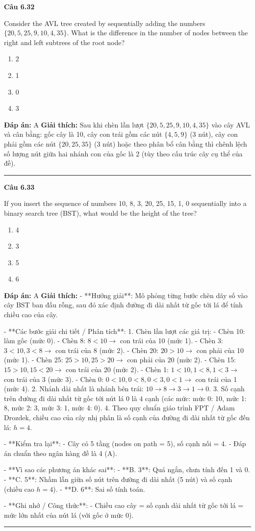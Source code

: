 \documentclass[11pt,a4paper]{article}
\newenvironment{question}[1]{%
  \par\vspace{1em}\noindent\textbf{\large Câu #1}\par\vspace{0.4em}
}{%
  \par\vspace{1em}\hrule\vspace{0.6em}
}
\newenvironment{choices}{%
  \begin{enumerate}[label=\textbf{\Alph*.},leftmargin=2.2em,itemsep=2pt,topsep=3pt]
}{%
  \end{enumerate}
}
\newcommand{\choice}{\item}
\begin{document}
\begin{question}{6.32}
Consider the AVL tree created by sequentially adding the numbers \(\{20, 5, 25, 9, 10, 4, 35\}\). What is the difference in the number of nodes between the right and left subtrees of the root node?
\begin{choices}
\choice 2
\choice 1
\choice 0
\choice 3
\end{choices}
\textbf{Đáp án:} A
\textbf{Giải thích:} Sau khi chèn lần lượt \(\{20, 5, 25, 9, 10, 4, 35\}\) vào cây AVL và cân bằng: gốc cây là 10, cây con trái gồm các nút \(\{4, 5, 9\}\) (3 nút), cây con phải gồm các nút \(\{20, 25, 35\}\) (3 nút) hoặc theo phân bổ cân bằng thì chênh lệch số lượng nút giữa hai nhánh con của gốc là 2 (tùy theo cấu trúc cây cụ thể của đề).
\end{question}

\begin{question}{6.33}
If you insert the sequence of numbers {10, 8, 3, 20, 25, 15, 1, 0} sequentially into a binary search tree (BST), what would be the height of the tree?
\begin{choices}
\choice 4
\choice 3
\choice 5
\choice 6
\end{choices}
\textbf{Đáp án:} A
\textbf{Giải thích:} - **Hướng giải**:
  Mô phỏng từng bước chèn dãy số vào cây BST ban đầu rỗng, sau đó xác định đường đi dài nhất từ gốc tới lá để tính chiều cao của cây.

- **Các bước giải chi tiết / Phân tích**:
  1. Chèn lần lượt các giá trị:
     - Chèn 10: làm gốc (mức 0).
     - Chèn 8: \(8 < 10 \rightarrow\) con trái của 10 (mức 1).
     - Chèn 3: \(3 < 10, 3 < 8 \rightarrow\) con trái của 8 (mức 2).
     - Chèn 20: \(20 > 10 \rightarrow\) con phải của 10 (mức 1).
     - Chèn 25: \(25 > 10, 25 > 20 \rightarrow\) con phải của 20 (mức 2).
     - Chèn 15: \(15 > 10, 15 < 20 \rightarrow\) con trái của 20 (mức 2).
     - Chèn 1: \(1 < 10, 1 < 8, 1 < 3 \rightarrow\) con trái của 3 (mức 3).
     - Chèn 0: \(0 < 10, 0 < 8, 0 < 3, 0 < 1 \rightarrow\) con trái của 1 (mức 4).
  2. Nhánh dài nhất là nhánh bên trái: \(10 \rightarrow 8 \rightarrow 3 \rightarrow 1 \rightarrow 0\).
  3. Số cạnh trên đường đi dài nhất từ gốc tới nút lá 0 là \(4\) cạnh (các mức: mức 0: 10, mức 1: 8, mức 2: 3, mức 3: 1, mức 4: 0).
  4. Theo quy chuẩn giáo trình FPT / Adam Drozdek, chiều cao của cây nhị phân là số cạnh của đường đi dài nhất từ gốc đến lá: \(h = 4\).

- **Kiểm tra lại**:
  - Cây có 5 tầng (nodes on path = 5), số cạnh nối = 4.
  - Đáp án chuẩn theo ngân hàng đề là 4 (A).

- **Vì sao các phương án khác sai**:
  - **B. 3**: Quá ngắn, chưa tính đến 1 và 0.
  - **C. 5**: Nhầm lẫn giữa số nút trên đường đi dài nhất (5 nút) và số cạnh (chiều cao \(h = 4\)).
  - **D. 6**: Sai số tính toán.

- **Ghi nhớ / Công thức**:
  - Chiều cao cây = số cạnh dài nhất từ gốc tới lá = mức lớn nhất của nút lá (với gốc ở mức 0).
\end{question}
\end{document}

